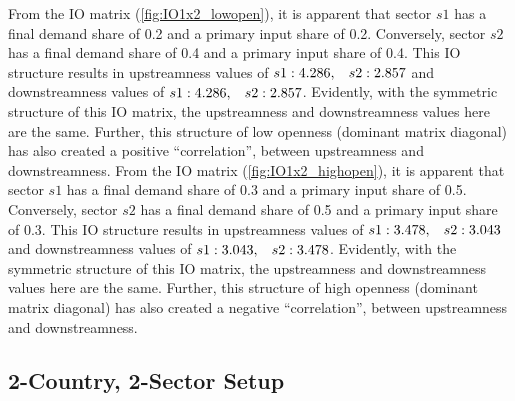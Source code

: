 \begin{figure}[H]
\end{figure}

From the IO matrix (\ref{fig:IO1x2_lowopen}), it is apparent that sector $s1$ has a final demand share of 0.2 and a primary input share of 0.2.
Conversely, sector $s2$ has a final demand share of 0.4 and a primary input share of 0.4. This IO structure results in upstreamness values of
$s1: 4.286,\hspace{3mm} s2: 2.857$ and downstreamness values of $s1: 4.286,\hspace{3mm} s2: 2.857$. 
Evidently, with the symmetric structure of this IO matrix, the upstreamness and downstreamness values here are the same. Further, this structure of 
low openness (dominant matrix diagonal) has also created a positive ``correlation'', between upstreamness and downstreamness.
From the IO matrix (\ref{fig:IO1x2_highopen}), it is apparent that sector $s1$ has a final demand share of 0.3 and a primary input share of 0.5.
Conversely, sector $s2$ has a final demand share of 0.5 and a primary input share of 0.3. This IO structure results in upstreamness values of
$s1: 3.478,\hspace{3mm} s2: 3.043$ and downstreamness values of $s1: 3.043,\hspace{3mm} s2: 3.478$.
Evidently, with the symmetric structure of this IO matrix, the upstreamness and downstreamness values here are the same. Further, this structure of 
high openness (dominant matrix diagonal) has also created a negative ``correlation'', between upstreamness and downstreamness.

\subsection{2-Country, 2-Sector Setup}

